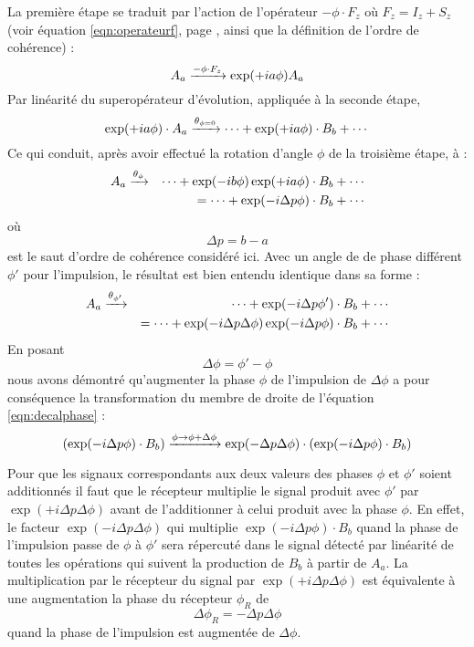 La première étape se traduit par l'action de l'opérateur $-\phi \cdot F_z$
où $F_z = I_z + S_z$ (voir équation \ref{eqn:operateurf}, page \pageref{eqn:operateurf},
ainsi que la définition de l'ordre de cohérence) :
\begin{equation}
A_a \xrightarrow{-\phi \cdot F_z}\exp(+ia\phi) A_a
\end{equation}
Par linéarité du superopérateur d'évolution, appliquée à la seconde étape,
\begin{equation}
\exp(+ia\phi) \cdot A_a \xrightarrow{\theta_{\phi=0}} 
\cdots + \exp(+ia\phi) \cdot B_b + \cdots
\end{equation}
Ce qui conduit, après avoir effectué la rotation d'angle $\phi$ de la troisième étape, à :
\begin{eqnarray}
A_a & \xrightarrow{\theta_{\phi}} &
\cdots + \exp(-ib\phi)\exp(+ia\phi) \cdot B_b + \cdots \\
\label{eqn:decalphase} & & = \cdots + \exp(-i\Delta p\phi) \cdot B_b + \cdots
\end{eqnarray}
où
\begin{equation}
\Delta p = b - a
\end{equation}
est le saut d'ordre de cohérence considéré ici.
Avec un angle de de phase différent $\phi'$ pour l'impulsion, le résultat est bien
entendu identique dans sa forme :
\begin{eqnarray}
A_a  &\xrightarrow{\theta_{\phi'}} &
\cdots + \exp(-i\Delta p\phi') \cdot B_b + \cdots \\
& & = \cdots + \exp(-i\Delta p \Delta\phi)\exp(-i\Delta p\phi) \cdot B_b + \cdots
\end{eqnarray}
En posant
\begin{equation}
\Delta \phi = \phi' - \phi
\end{equation}
nous avons démontré qu'augmenter la phase $\phi$ de l'impulsion de $\Delta \phi$
a pour conséquence la transformation du membre de droite de l'équation \ref{eqn:decalphase} :
\begin{equation}
(\exp(-i\Delta p\phi) \cdot B_b)
\xrightarrow{\phi \rightarrow \phi+\Delta \phi}
\exp(-\Delta p \Delta\phi) \cdot (\exp(-i\Delta p\phi) \cdot B_b) 
\end{equation}

Pour que les signaux correspondants aux deux valeurs des phases $\phi$ et $\phi'$
soient additionnés il faut que le récepteur multiplie le signal produit avec $\phi'$
par $\exp(+i\Delta p \Delta\phi)$ avant de l'additionner à celui produit avec la phase $\phi$.
En effet, le facteur $\exp(-i\Delta p \Delta\phi)$ qui multiplie 
$\exp(-i\Delta p\phi) \cdot B_b$ quand la phase de l'impulsion passe de
$\phi$ à $\phi'$ sera répercuté dans le signal détecté
par linéarité de toutes les opérations qui suivent la production de $B_b$
à partir de $A_a$.
La multiplication par le récepteur du signal par $\exp(+i\Delta p \Delta\phi)$
est équivalente à une augmentation la phase du récepteur $\phi_R$ de
\begin{equation}
\label{eqn:masterphase}
\Delta \phi_R = -\Delta p \Delta\phi
\end{equation}
quand la phase de l'impulsion est augmentée de $\Delta \phi$.

